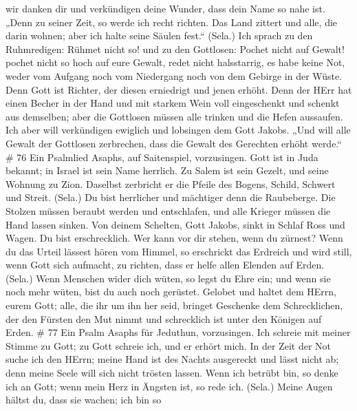 wir danken dir und verkündigen deine Wunder, dass dein Name so nahe ist.
 „Denn zu seiner Zeit, so werde ich recht richten.
 Das Land zittert und alle, die darin wohnen; aber ich halte
seine Säulen fest.`` (Sela.)  Ich sprach zu den Ruhmredigen:
Rühmet nicht so! und zu den Gottlosen: Pochet nicht auf Gewalt!
 pochet nicht so hoch auf eure Gewalt, redet nicht
halsstarrig,  es habe keine Not, weder vom Aufgang noch vom
Niedergang noch von dem Gebirge in der Wüste.  Denn Gott ist
Richter, der diesen erniedrigt und jenen erhöht.  Denn der
HErr hat einen Becher in der Hand und mit starkem Wein voll eingeschenkt
und schenkt aus demselben; aber die Gottlosen müssen alle trinken und
die Hefen aussaufen.  Ich aber will verkündigen ewiglich
und lobsingen dem Gott Jakobs.  „Und will alle Gewalt der
Gottlosen zerbrechen, dass die Gewalt des Gerechten erhöht werde.`` \#
76  Ein Psalmlied Asaphs, auf Saitenspiel, vorzusingen.
 Gott ist in Juda bekannt; in Israel ist sein Name herrlich.
 Zu Salem ist sein Gezelt, und seine Wohnung zu Zion.
 Daselbst zerbricht er die Pfeile des Bogens, Schild,
Schwert und Streit. (Sela.)  Du bist herrlicher und
mächtiger denn die Raubeberge.  Die Stolzen müssen beraubt
werden und entschlafen, und alle Krieger müssen die Hand lassen sinken.
 Von deinem Schelten, Gott Jakobs, sinkt in Schlaf Ross und
Wagen.  Du bist erschrecklich. Wer kann vor dir stehen, wenn
du zürnest?  Wenn du das Urteil lässest hören vom Himmel, so
erschrickt das Erdreich und wird still,  wenn Gott sich
aufmacht, zu richten, dass er helfe allen Elenden auf Erden. (Sela.)
 Wenn Menschen wider dich wüten, so legst du Ehre ein; und
wenn sie noch mehr wüten, bist du auch noch gerüstet. 
Gelobet und haltet dem HErrn, eurem Gott; alle, die ihr um ihn her seid,
bringet Geschenke dem Schrecklichen,  der den Fürsten den
Mut nimmt und schrecklich ist unter den Königen auf Erden. \# 77
 Ein Psalm Asaphs für Jeduthun, vorzusingen. 
Ich schreie mit meiner Stimme zu Gott; zu Gott schreie ich, und er
erhört mich.  In der Zeit der Not suche ich den HErrn; meine
Hand ist des Nachts ausgereckt und lässt nicht ab; denn meine Seele will
sich nicht trösten lassen.  Wenn ich betrübt bin, so denke
ich an Gott; wenn mein Herz in Ängsten ist, so rede ich. (Sela.)
 Meine Augen hältst du, dass sie wachen; ich bin so
